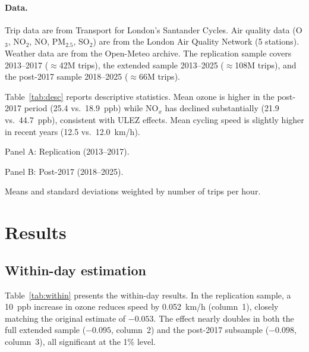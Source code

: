 \documentclass[12pt]{article}
\begin{document}
\paragraph{Data.} Trip data are from Transport for London's Santander Cycles. Air quality data (O$_3$, NO$_2$, NO, PM$_{2.5}$, SO$_2$) are from the London Air Quality Network (5 stations). Weather data are from the Open-Meteo archive. The replication sample covers 2013--2017 ($\approx$42M trips), the extended sample 2013--2025 ($\approx$108M trips), and the post-2017 sample 2018--2025 ($\approx$66M trips).

Table~\ref{tab:desc} reports descriptive statistics. Mean ozone is higher in the post-2017 period (25.4 vs.\ 18.9~ppb) while NO$_x$ has declined substantially (21.9 vs.\ 44.7~ppb), consistent with ULEZ effects. Mean cycling speed is slightly higher in recent years (12.5 vs.\ 12.0~km/h).

\begin{table}[H]
\centering
\caption{Descriptive statistics (hourly, trip-weighted).}
\label{tab:desc}

\medskip
\small Panel A: Replication (2013--2017).



\medskip
\small Panel B: Post-2017 (2018--2025).



\medskip
\footnotesize Means and standard deviations weighted by number of trips per hour.
\end{table}


\section{Results} \label{sec:results}

\subsection{Within-day estimation}

Table~\ref{tab:within} presents the within-day results. In the replication sample, a 10~ppb increase in ozone reduces speed by 0.052~km/h (column~1), closely matching the original estimate of $-0.053$. The effect nearly doubles in both the full extended sample ($-0.095$, column~2) and the post-2017 subsample ($-0.098$, column~3), all significant at the 1\% level.
\end{document}
